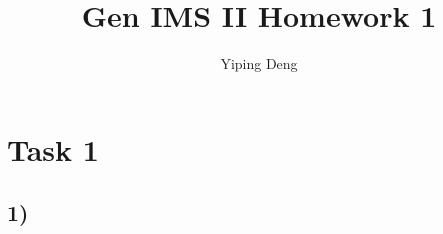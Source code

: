 \documentclass{article}
\newcommand{\hwnumber}{1}
\begin{document}
\title{Gen IMS II Homework \hwnumber}
\author{Yiping Deng}
\maketitle
\thispagestyle{fancy}
\section*{Task 1}
\subsection*{1)}
\end{document}
